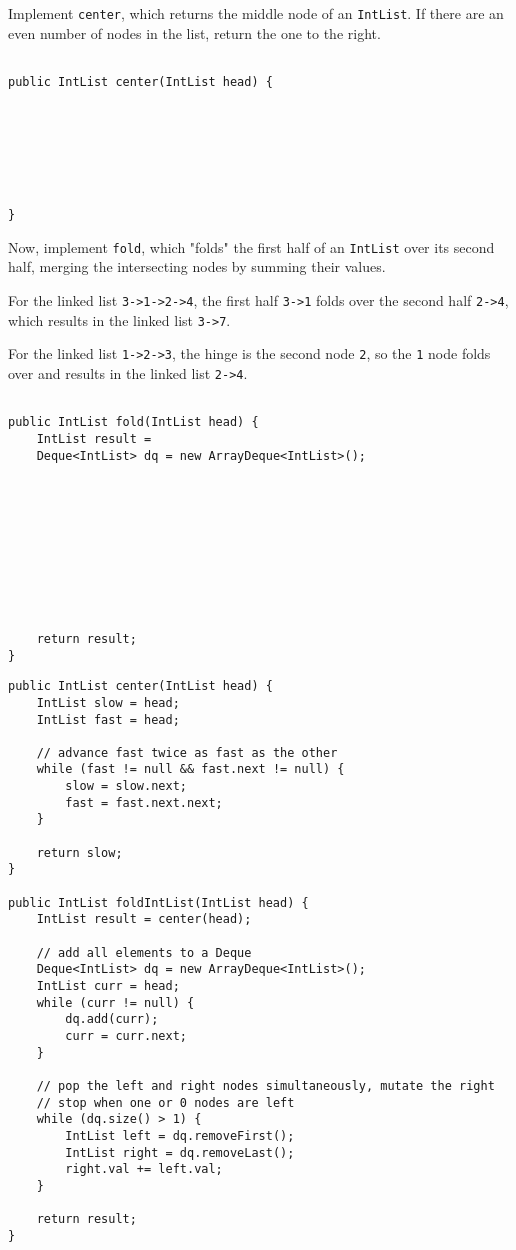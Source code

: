 \question Implement \lstinline$center$, which returns the middle node of an \lstinline$IntList$. If there are an even number of nodes in the list, return the one to the right.
\begin{lstlisting}

public IntList center(IntList head) {







}
\end{lstlisting}
\question Now, implement \lstinline$fold$, which "folds" the first half of an \lstinline$IntList$ over its second half, merging the intersecting nodes by summing their values.

For the linked list \lstinline$3->1->2->4$, the first half \lstinline$3->1$ folds over the second half \lstinline$2->4$, which results in the linked list \lstinline$3->7$.

For the linked list \lstinline$1->2->3$, the hinge is the second node \lstinline$2$, so the \lstinline$1$ node folds over and results in the linked list \lstinline$2->4$.
\begin{lstlisting}

public IntList fold(IntList head) {
    IntList result = 
    Deque<IntList> dq = new ArrayDeque<IntList>();
    
    
    
    
    
    
    
    
    
    
    return result;
}
\end{lstlisting}

\newpage
\begin{solution}
\begin{lstlisting}
public IntList center(IntList head) {
	IntList slow = head;
	IntList fast = head;
	
	// advance fast twice as fast as the other
	while (fast != null && fast.next != null) {
		slow = slow.next;
		fast = fast.next.next;
	}

	return slow;
}

public IntList foldIntList(IntList head) {
	IntList result = center(head);
	
	// add all elements to a Deque
	Deque<IntList> dq = new ArrayDeque<IntList>();
	IntList curr = head;
	while (curr != null) {
		dq.add(curr);
		curr = curr.next;
	}

	// pop the left and right nodes simultaneously, mutate the right
	// stop when one or 0 nodes are left
	while (dq.size() > 1) {
		IntList left = dq.removeFirst();
		IntList right = dq.removeLast();
		right.val += left.val;
	}
	
	return result;
}
\end{lstlisting}
\end{solution}
